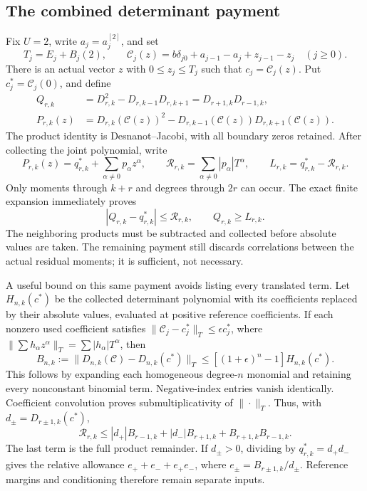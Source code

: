\subsection{The combined determinant payment}
Fix \(U=2\), write \(a_j=a_j^{[2]}\), and set
\begin{equation}
 T_j=E_j+B_j(2),\qquad
 \mathcal C_j(z)=b\delta_{j0}+a_{j-1}-a_j+z_{j-1}-z_j
 \quad(j\ge0).
\end{equation}
There is an actual vector \(z\) with \(0\le z_j\le T_j\) such that
\(c_j=\mathcal C_j(z)\).  Put \(c_j^*=\mathcal C_j(0)\), and define
\begin{align}
 Q_{r,k}&=D_{r,k}^2-D_{r,k-1}D_{r,k+1}
          =D_{r+1,k}D_{r-1,k},\\
 P_{r,k}(z)&=D_{r,k}(\mathcal C(z))^2
       -D_{r,k-1}(\mathcal C(z))D_{r,k+1}(\mathcal C(z)).
 \label{eq:green-joint-Q}
\end{align}
The product identity is Desnanot--Jacobi, with all boundary zeros retained.
After collecting the joint polynomial, write
\begin{equation}
 P_{r,k}(z)=q^*_{r,k}+\sum_{\alpha\ne0}p_\alpha z^\alpha,
 \qquad \mathcal R_{r,k}=\sum_{\alpha\ne0}|p_\alpha|T^\alpha,
 \qquad L_{r,k}=q^*_{r,k}-\mathcal R_{r,k}.
 \label{eq:green-Taylor-payment}
\end{equation}
Only moments through \(k+r\) and degrees through \(2r\) can occur.
The exact finite expansion immediately proves
\begin{equation}
 |Q_{r,k}-q^*_{r,k}|\le\mathcal R_{r,k},\qquad Q_{r,k}\ge L_{r,k}.
 \label{eq:green-absolute-payment}
\end{equation}
The neighboring products must be subtracted and collected before absolute
values are taken.  The remaining payment still discards correlations
between the actual residual moments; it is sufficient, not necessary.

A useful bound on this same payment avoids listing every translated term.
Let \(H_{n,k}(c^*)\) be the collected determinant polynomial with its
coefficients replaced by their absolute values, evaluated at positive
reference coefficients.  If each nonzero used coefficient satisfies
\(\|\mathcal C_j-c_j^*\|_T\le\epsilon c_j^*\), where
\(\|\sum h_\alpha z^\alpha\|_T=\sum|h_\alpha|T^\alpha\), then
\begin{equation}
 B_{n,k}:=\|D_{n,k}(\mathcal C)-D_{n,k}(c^*)\|_T
 \le[(1+\epsilon)^n-1]H_{n,k}(c^*).
 \label{eq:green-det-norm}
\end{equation}
This follows by expanding each homogeneous degree-\(n\) monomial and
retaining every nonconstant binomial term.  Negative-index entries vanish
identically.  Coefficient convolution proves submultiplicativity of
\(\|\cdot\|_T\).  Thus, with \(d_\pm=D_{r\pm1,k}(c^*)\),
\begin{equation}
 \mathcal R_{r,k}\le
 |d_+|B_{r-1,k}+|d_-|B_{r+1,k}+B_{r+1,k}B_{r-1,k}.
 \label{eq:green-product-payment}
\end{equation}
The last term is the full product remainder.  If \(d_\pm>0\), dividing
by \(q^*_{r,k}=d_+d_-\) gives the relative allowance
\(e_++e_-+e_+e_-\), where \(e_\pm=B_{r\pm1,k}/d_\pm\).
Reference margins and conditioning therefore remain separate inputs.


